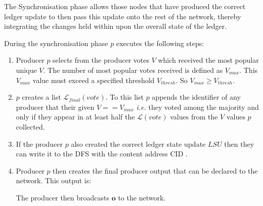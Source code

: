 The Synchronisation phase allows those nodes that have produced the correct ledger update to then pass this update onto the rest of the network, thereby integrating the changes held within upon the overall state of the ledger.

During the synchronisation phase $p$ executes the following steps:

\begin{enumerate}

\item Producer $p$ selects from the producer votes $V$ which received the most popular unique $V$. %
The number of most popular votes received is defined as $V_{max}$. This $V_{max}$ value must exceed a specified threshold $V_{thresh}$. So $V_{max} \geq V_{thresh}$. %

\item $p$ creates a list $\mathcal{L}_{final}(vote)$. To this list $p$ appends the identifier of any producer that their given $V == V_{max}$ \textit{i.e.} they voted among the majority and only if they appear in at least half the $\mathcal{L}(vote)$ values from the $V$ values $p$ collected. %

\item If the producer $p$ also created the correct ledger state update $LSU$ then they can write it to the DFS with the content address CID \cite{ADD LINK TO CID OBJ}.

\item Producer $p$ then creates the final producer output that can be declared to the network. This output is:
\begin{center}
\label{eq:Hj}
\end{center}


The producer then broadcasts $\mathbf{o}$ to the network.
\end{enumerate}

